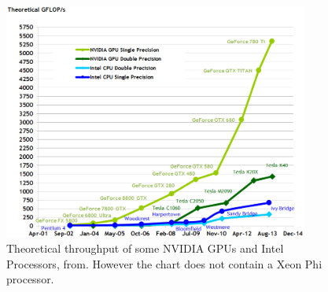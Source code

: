 \documentclass[10pt,a4paper]{report}
\begin{document}
\begin{figure}[h]
    \centering
    \includegraphics[width=10cm]{floating-point-operations-per-second.png}
    \caption{Theoretical throughput of some NVIDIA GPUs and Intel Processors, from\cite{cuda}. However the chart does not contain a Xeon Phi processor.}
    \label{fig:gpu_vs_cpu}
\end{figure}
\end{document}
